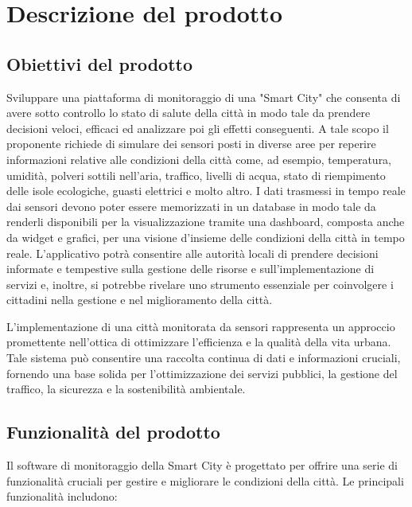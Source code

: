 \documentclass{article}
\begin{document}
\section{Descrizione del prodotto}
\subsection{Obiettivi del prodotto}
Sviluppare una piattaforma di monitoraggio di una "Smart City" che consenta di avere sotto
controllo lo stato di salute della città in modo tale da prendere decisioni veloci, efficaci
ed analizzare poi gli effetti conseguenti.
A tale scopo il proponente richiede di simulare dei sensori posti in diverse aree per reperire
informazioni relative alle condizioni della città come, ad esempio, temperatura, umidità,
polveri sottili nell’aria, traffico, livelli di acqua, stato di riempimento delle isole ecologiche,
guasti elettrici e molto altro.
I dati trasmessi in tempo reale dai sensori devono poter essere memorizzati in un database
in modo tale da renderli disponibili per la visualizzazione tramite una dashboard, composta anche da widget e grafici, per una visione d’insieme delle condizioni della città in
tempo reale.
L’applicativo potrà consentire alle autorità locali di prendere decisioni informate e tempestive sulla gestione delle risorse e sull’implementazione di servizi e, inoltre, si potrebbe
rivelare uno strumento essenziale per coinvolgere i cittadini nella gestione e nel miglioramento della città.
\vspace{0.3cm}

L’implementazione di una città monitorata da sensori rappresenta un approccio promettente
nell’ottica di ottimizzare l’efficienza e la qualità della vita urbana. Tale sistema può consentire
una raccolta continua di dati e informazioni cruciali, fornendo una base solida per
l’ottimizzazione dei servizi pubblici, la gestione del traffico, la sicurezza e la sostenibilità
ambientale.


\subsection{Funzionalità del prodotto}

Il software di monitoraggio della Smart City è progettato per offrire una serie di funzionalità cruciali per gestire e migliorare le condizioni della città. Le principali funzionalità includono:
\end{document}
